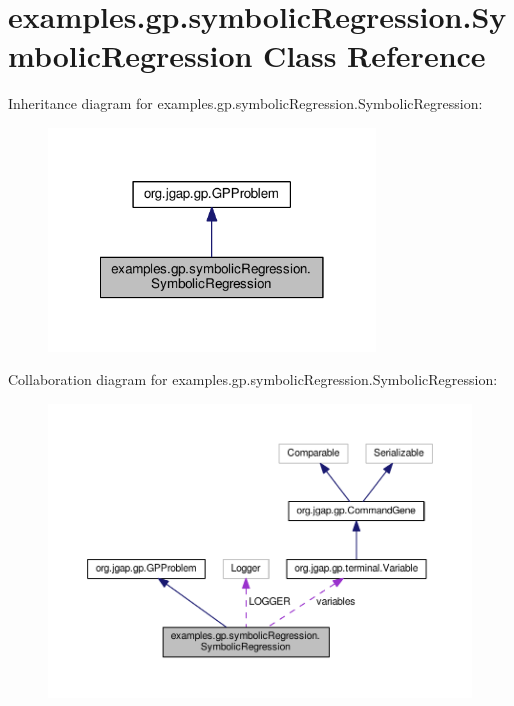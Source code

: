 \hypertarget{classexamples_1_1gp_1_1symbolic_regression_1_1_symbolic_regression}{\section{examples.\-gp.\-symbolic\-Regression.\-Symbolic\-Regression Class Reference}
\label{classexamples_1_1gp_1_1symbolic_regression_1_1_symbolic_regression}
}


Inheritance diagram for examples.\-gp.\-symbolic\-Regression.\-Symbolic\-Regression\-:
\nopagebreak
\begin{figure}[H]
\begin{center}
\leavevmode
\includegraphics[width=246pt]{classexamples_1_1gp_1_1symbolic_regression_1_1_symbolic_regression__inherit__graph}
\end{center}
\end{figure}


Collaboration diagram for examples.\-gp.\-symbolic\-Regression.\-Symbolic\-Regression\-:
\nopagebreak
\begin{figure}[H]
\begin{center}
\leavevmode
\includegraphics[width=350pt]{classexamples_1_1gp_1_1symbolic_regression_1_1_symbolic_regression__coll__graph}
\end{center}
\end{figure}
